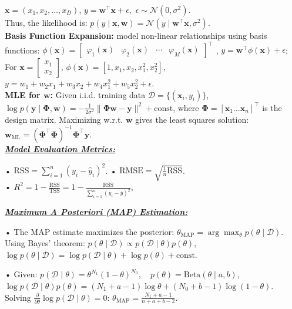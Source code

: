 \documentclass[10pt]{article}
\newcommand{\bulletPoint}[1]{\ul{\textit{\textbf{#1}}}}
\begin{document}
\begin{multicols*}{3}
$\mathbf{x} = (x_1, x_2, \dots, x_D)$, 
$y = \mathbf{w}^\top \mathbf{x} + \epsilon, $ $ \epsilon \sim \mathcal{N}(0, \sigma^2)$.\\
Thus, the likelihood is:
$p(y \mid \mathbf{x}, \mathbf{w}) = \mathcal{N}(y \mid \mathbf{w}^\top \mathbf{x}, \sigma^2)$. \\
\textbf{Basis Function Expansion:} model non-linear relationships using basis functions:
$
\phi(\mathbf{x}) =
\begin{bmatrix}
\varphi_1(\mathbf{x}) & \varphi_2(\mathbf{x}) & \cdots & \varphi_M(\mathbf{x})
\end{bmatrix}^{\top}
$
, \quad
$y = \mathbf{w}^\top \phi(\mathbf{x}) + \epsilon$; 
For $\mathbf{x} = \begin{bmatrix} x_1 \\ x_2 \end{bmatrix}$, $\phi(\mathbf{x}) = [1, x_1, x_2, x_1^2, x_2^2]$,
$y = w_1 + w_2 x_1 + w_3 x_2 + w_4 x_1^2 + w_5 x_2^2 + \epsilon$. \\
\textbf{MLE for $\mathbf{w}$:} Given i.i.d. training data $\mathcal{D} = \{(\mathbf{x}_i, y_i)\}$, 
$\log p(\mathbf{y} \mid \mathbf{\Phi}, \mathbf{w}) = -\frac{1}{2\sigma^2} \|\mathbf{\Phi} \mathbf{w} - \mathbf{y} \|^2 + \text{const}$,
where $\mathbf{\Phi} = [\mathbf{x}_1 \dots \mathbf{x}_n]^\top$ is the design matrix.
Maximizing w.r.t. $\mathbf{w}$ gives the least squares solution:
$\mathbf{w}_{\text{ML}} = (\mathbf{\Phi}^\top \mathbf{\Phi})^{-1} \mathbf{\Phi}^\top \mathbf{y}$. \\


\bulletPoint{Model Evaluation Metrics:}\quad

• $\text{RSS} = \sum_{i=1}^{n} (y_i - \hat{y}_i)^2$. \quad
• $\text{RMSE} = \sqrt{\frac{1}{n} \text{RSS}}$. \\
• $R^2 = 1 - \frac{\text{RSS}}{\text{TSS}} = 1 - \frac{\text{RSS}}{\sum_{i=1}^{n} (y_i - \bar{y})^2}$,

\bulletPoint{Maximum A Posteriori (MAP) Estimation:}\quad

• The MAP estimate maximizes the posterior:
$\theta_{\text{MAP}} = \arg\max_{\theta} p(\theta \mid \mathcal{D})$. Using Bayes' theorem: $p(\theta \mid \mathcal{D}) \propto p(\mathcal{D} \mid \theta) p(\theta)$,
$\log p(\theta \mid \mathcal{D}) = \log p(\mathcal{D} \mid \theta) + \log p(\theta) + \text{const}$. 

• Given:
$p(\mathcal{D} \mid \theta) = \theta^{N_1} (1 - \theta)^{N_0}, \quad p(\theta) = \text{Beta}(\theta \mid a, b)$,
$\log p(\mathcal{D} \mid \theta) p(\theta) = (N_1 + a - 1) \log \theta + (N_0 + b - 1) \log(1 - \theta)$.
Solving $\frac{\partial}{\partial \theta} \log p(\mathcal{D} \mid \theta) = 0$:
$\theta_{\text{MAP}} = \frac{N_1 + a - 1}{n + a + b - 2}$.


\end{multicols*}
\end{document}

